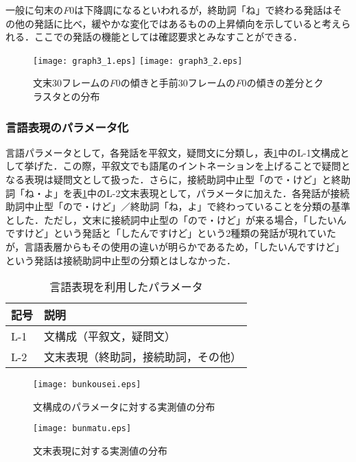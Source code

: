 \documentclass[japanese]{jnlp_1.3c}
\begin{document}
一般に句末の{\it F}{\tiny 0}は下降調になるといわれるが，終助詞「ね」で終わる発話はその他の発話に比べ，緩やかな変化ではあるものの上昇傾向を示していると考えられる．ここでの発話の機能としては確認要求とみなすことができる．

\begin{figure}[b]
\begin{center}
    \texttt{[image: graph3\_1.eps]}
    \texttt{[image: graph3\_2.eps]}
\caption{文末30フレームの{\it F}{\tiny 0}の傾きと手前30フレームの{\it F}{\tiny 0}の傾きの差分とクラスタとの分布}
\label{fig:diff}
\end{center} 
\end{figure} 

\subsubsection{言語表現のパラメータ化}
言語パラメータとして，各発話を平叙文，疑問文に分類し，表\ref{tb:ling_param}中のL-1文構成として挙げた．この際，平叙文でも語尾のイントネーションを上げることで疑問となる表現は疑問文として扱った．さらに，接続助詞中止型「ので・けど」と終助詞「ね・よ」を表\ref{tb:ling_param}中のL-2文末表現として，パラメータに加えた．各発話が接続助詞中止型「ので・けど」／終助詞「ね，よ」で終わっていることを分類の基準とした．ただし，文末に接続詞中止型の「ので・けど」が来る場合，「したいんですけど」という発話と「したんですけど」という2種類の発話が現れていたが，言語表層からもその使用の違いが明らかであるため，「したいんですけど」という発話は接続助詞中止型の分類とはしなかった．
  
\begin{table}[t] 
\caption{言語表現を利用したパラメータ}
\label{tb:ling_param}
\begin{center}
\begin{tabular}{ll}
\hline
記号&説明 \\ \hline
L-1&文構成（平叙文，疑問文）\\
L-2&文末表現（終助詞，接続助詞，その他）\\ \hline
\end{tabular}
\end{center}
\end{table}
\begin{figure}[t]
\begin{minipage}{0.45\textwidth}
\begin{center}
    \texttt{[image: bunkousei.eps]}
\caption{文構成のパラメータに対する実測値の分布}
\label{fig:bunkousei}
\end{center} 
\end{minipage}
    \hfill
\begin{minipage}{0.45\textwidth}
\vspace{7.2pt}
\begin{center}
    \texttt{[image: bunmatu.eps]}
\caption{文末表現に対する実測値の分布}
\label{fig:bunmatu}
\end{center} 
\end{minipage}
\end{figure} 
\end{document}

